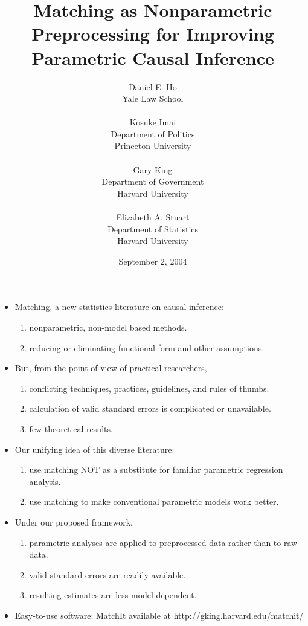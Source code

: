 \documentclass[20pt,landscape,pdftex]{foils}
\title{Matching as Nonparametric Preprocessing for Improving
  Parametric Causal Inference}
\date{September 2, 2004}
\author{Daniel E. Ho \\
  Yale Law School\\
  \\
  Kosuke Imai\\
  Department of Politics\\ Princeton University \\
  \\ 
  Gary King\\
  Department of Government\\ Harvard University\\
  \\
  Elizabeth A. Stuart\\
  Department of Statistics\\ Harvard University
\mbox{}\pdfbookmark{TitlePage}{stlab0}}
\begin{document}
\color{black}
\LOGOOFF
\maketitle



\hypersetup{pdfpagetransition=Replace}

\begin{itemize}
\item Matching, a new statistics literature on causal inference:\pause
  \begin{enumerate}
  \item nonparametric, non-model based methods.\pause
  \item reducing or eliminating functional form and other assumptions.\pause
  \end{enumerate}
  
\item But, from the point of view of practical researchers,\pause
  \begin{enumerate}    
  \item conflicting techniques, practices, guidelines, and rules of thumbs. \pause
  \item calculation of valid standard errors is complicated or
    unavailable.\pause
  \item few theoretical results.\pause
  \end{enumerate}

\item Our unifying idea of this diverse literature:\pause 
  \begin{enumerate}
  \item use matching NOT as a substitute for familiar parametric
    regression analysis.\pause
  \item use matching to make conventional parametric models work better.\pause
  \end{enumerate}

\item Under our proposed framework,\pause
  \begin{enumerate}
  \item parametric analyses are applied to preprocessed data rather
    than to raw data.\pause
  \item valid standard errors are readily available.\pause
  \item resulting estimates are less model dependent.\pause
  \end{enumerate} 

\item Easy-to-use software: MatchIt available at http://gking.harvard.edu/matchit/
\end{itemize}
\end{document}
